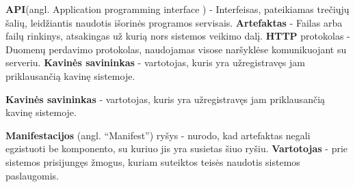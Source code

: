 \documentclass{VUMIFPSkursinis}
\begin{document}
\noindent

\textbf{API}(angl. Application programming interface ) - Interfeisas, pateikiamas trečiųjų šalių, leidžiantis naudotis išorinės programos servisais.
\newline
\textbf{Artefaktas} - Failas arba failų rinkinys, atsakingas už kurią nors sistemos veikimo dalį. 
\newline
\textbf{HTTP} protokolas - Duomenų perdavimo protokolas, naudojamas visose naršyklėse komunikuojant su serveriu.
\newline
\textbf{Kavinės savininkas} - vartotojas, kuris yra užregistravęs jam priklausančią kavinę sistemoje.

\newline
\textbf{Kavinės savininkas} - vartotojas, kuris yra užregistravęs jam priklausančią kavinę sistemoje.
\newline

\textbf{Manifestacijos} (angl. “Manifest”) ryšys - nurodo, kad artefaktas negali egzistuoti be komponento, su kuriuo jis yra susietas šiuo ryšiu.
\newline
\textbf{Vartotojas} - prie sistemos prisijungęs žmogus, kuriam suteiktos teisės naudotis sistemos paslaugomis.
\newline
\end{document}
